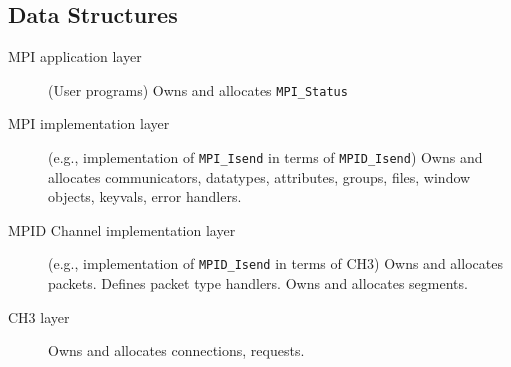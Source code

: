 \documentclass{article}
\def\code{\begingroup\makeustext\eatcode}
\def\eatcode#1{\texttt{#1}\endgroup}
\begin{document}
\subsection{Data Structures}
\begin{description}
\item[MPI application layer](User programs) Owns and allocates
  \code{MPI_Status} 
\item[MPI implementation layer](e.g., implementation of \code{MPI_Isend} in
  terms of \code{MPID_Isend}) Owns and allocates communicators, datatypes,
  attributes, groups, files, window objects, keyvals, error handlers.
\item[MPID Channel implementation layer](e.g., implementation of
  \code{MPID_Isend} in terms of CH3) Owns and allocates packets.
  Defines packet type handlers.  Owns and allocates segments.
\item[CH3 layer] Owns and allocates connections, requests.
\end{description}












\end{document}
